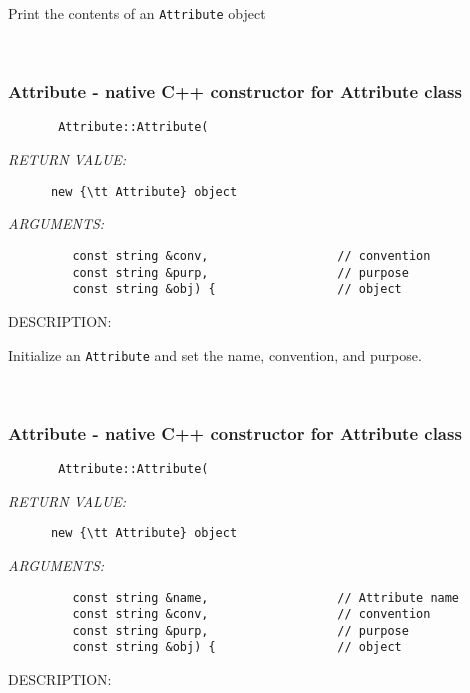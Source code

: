        Print the contents of an {\tt Attribute} object
   
 
\mbox{}\hrulefill\
 
\subsubsection [Attribute] {Attribute - native C++ constructor for Attribute class}


  
\begin{verbatim}       Attribute::Attribute(\end{verbatim}{\em RETURN VALUE:}
\begin{verbatim}      new {\tt Attribute} object\end{verbatim}{\em ARGUMENTS:}
\begin{verbatim}         const string &conv,                  // convention
         const string &purp,                  // purpose
         const string &obj) {                 // object\end{verbatim}
{\sf DESCRIPTION:\\ }


     Initialize an {\tt Attribute} and set the name, convention, and purpose.
   
 
\mbox{}\hrulefill\
 
\subsubsection [Attribute] {Attribute - native C++ constructor for Attribute class}


  
\begin{verbatim}       Attribute::Attribute(\end{verbatim}{\em RETURN VALUE:}
\begin{verbatim}      new {\tt Attribute} object\end{verbatim}{\em ARGUMENTS:}
\begin{verbatim}         const string &name,                  // Attribute name
         const string &conv,                  // convention
         const string &purp,                  // purpose
         const string &obj) {                 // object\end{verbatim}
{\sf DESCRIPTION:\\ }


